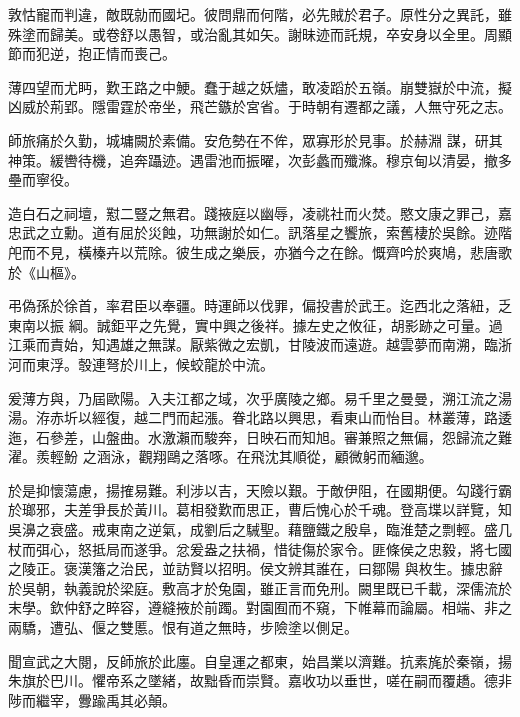 \begin{pinyinscope}
 敦怙寵而判違，敵既勍而國圮。彼問鼎而何階，必先賊於君子。原性分之異託，雖殊塗而歸美。或卷舒以愚智，或治亂其如矢。謝昧迹而託規，卒安身以全里。周顯節而犯逆，抱正情而喪己。



 薄四望而尤眄，歎王路之中鯁。蠢于越之妖燼，敢凌蹈於五嶺。崩雙嶽於中流，擬凶威於荊郢。隱雷霆於帝坐，飛芒鏃於宮省。于時朝有遷都之議，人無守死之志。



 師旅痛於久勤，城墉闕於素備。安危勢在不侔，眾寡形於見事。於赫淵
 謀，研其神策。緩轡待機，追奔躡迹。遇雷池而振曜，次彭蠡而殲滌。穆京甸以清晏，撤多壘而寧役。



 造白石之祠壇，懟二豎之無君。踐掖庭以幽辱，凌祧社而火焚。愍文康之罪己，嘉忠武之立勳。道有屈於災蝕，功無謝於如仁。訊落星之饗旅，索舊棲於吳餘。迹階戺而不見，橫榛卉以荒除。彼生成之樂辰，亦猶今之在餘。慨齊吟於爽鳩，悲唐歌於《山樞》。



 弔偽孫於徐首，率君臣以奉疆。時運師以伐罪，偏投書於武王。迄西北之落紐，乏東南以振
 綱。誠鉅平之先覺，實中興之後祥。據左史之攸征，胡影跡之可量。過江乘而責始，知遇雄之無謀。厭紫微之宏凱，甘陵波而遠遊。越雲夢而南溯，臨浙河而東浮。彀連弩於川上，候蛟龍於中流。



 爰薄方與，乃屆歐陽。入夫江都之域，次乎廣陵之鄉。易千里之曼曼，溯江流之湯湯。洊赤圻以經復，越二門而起漲。眷北路以興思，看東山而怡目。林叢薄，路逶迤，石參差，山盤曲。水激瀨而駿奔，日映石而知旭。審兼照之無偏，怨歸流之難濯。羨輕魵
 之涵泳，觀翔鷗之落啄。在飛沈其順從，顧微躬而緬邈。



 於是抑懷蕩慮，揚搉易難。利涉以吉，天險以艱。于敵伊阻，在國期便。勾踐行霸於瑯邪，夫差爭長於黃川。葛相發歎而思正，曹后愧心於千魂。登高堞以詳覽，知吳濞之衰盛。戒東南之逆氣，成劉后之駴聖。藉鹽鐵之殷阜，臨淮楚之剽輕。盛几杖而弭心，怒抵局而遂爭。忿爰盎之扶禍，惜徒傷於家令。匪條侯之忠毅，將七國之陵正。褒漢籓之治民，並訪賢以招明。侯文辨其誰在，曰鄒陽
 與枚生。據忠辭於吳朝，執義說於梁庭。敷高才於兔園，雖正言而免刑。闕里既已千載，深儒流於末學。欽仲舒之睟容，遵縫掖於前躅。對園囿而不窺，下帷幕而論屬。相端、非之兩驕，遭弘、偃之雙慝。恨有道之無時，步險塗以側足。



 聞宣武之大閱，反師旅於此廛。自皇運之都東，始昌業以濟難。抗素旄於秦嶺，揚朱旗於巴川。懼帝系之墜緒，故黜昏而崇賢。嘉收功以垂世，嗟在嗣而覆趫。德非陟而繼宰，釁踰禹其必顛。




\end{pinyinscope}
